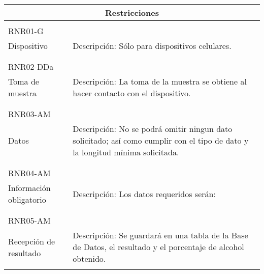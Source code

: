  
  \begin{center}
   \begin{tabular}{|p{5.5cm}|p{7cm}|}
     \hline
     \multicolumn{2}{|c|}{Restricciones} \\ \hline
     \\ RNR01-G \\ Dispositivo & Descripción: Sólo para dispositivos celulares. \\ \\ \hline
     \\ RNR02-DDa \\ Toma de muestra & Descripción: La toma de la muestra se obtiene al hacer contacto con el dispositivo. \\ \\ \hline
     \\ RNR03-AM \\ Datos & Descripción: No se podrá omitir ningun dato solicitado; así como cumplir con el tipo de dato y la longitud mínima solicitada. \\ \\ \hline
     \\ RNR04-AM \\ Información obligatorio & Descripción: Los datos requeridos serán: \\ \\ \hline
     \\ RNR05-AM \\ Recepción de resultado & Descripción: Se guardará en una tabla de la Base de Datos, el resultado y el porcentaje de alcohol obtenido. \\ \\ \hline     
   \end{tabular}
 \end{center}  
